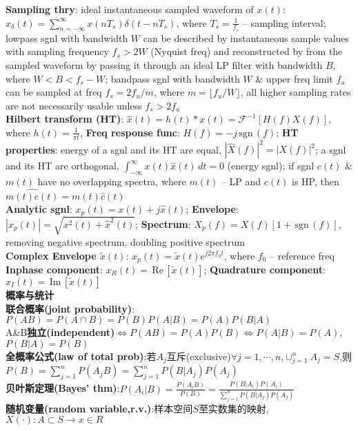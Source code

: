 \documentclass[UTF8,a4paper,10pt]{article}
\providecommand{\abs}[1]{\left\lvert#1\right\rvert}
\providecommand{\re}{\,\text{Re}\,}
\providecommand{\im}{\,\text{Im}\,}
\providecommand{\sgn}{\,\text{sgn}\,}
\begin{document}
\begin{multicols}{2}
    \textbf{Sampling thry}: ideal instantaneous sampled waveform of $x(t)$: $x_{\delta}(t)=\sum_{n=-\infty}^{\infty}x(nT_s)\delta(t-nT_s)$, where $T_s=\frac{1}{f_s}$ -- sampling interval; lowpass sgnl with bandwidth $W$ can be described by instantaneous sample values with sampling frequency $f_s>2W$ (Nyquist freq) and reconstructed by from the sampled waveform by passing it through an ideal LP filter with bandwidth $B$, where $W<B<f_s-W$; bandpass sgnl with bandwidth $W$ \& upper freq limit $f_u$ can be sampled at freq $f_s=2f_u/m$, where $m=\lfloor f_u/W\rfloor$, all higher sampling rates are not necessarily usable unless $f_s>2f_u$\\
    \textbf{Hilbert transform (HT)}: $\hat{x}(t)=h(t)*x(t)=\mathscr{F}^{-1}[H(f)X(f)]$, where $h(t)=\frac{1}{\pi t}$, \textbf{Freq response func}: $H(f)=-j\sgn(f)$; \textbf{HT properties}: energy of a sgnl and its HT are equal, $\abs{\hat{X}(f)}^2=\abs{X(f)}^2$; a sgnl and its HT are orthogonal, $\int_{-\infty}^{\infty}x(t)\hat{x}(t)\,dt=0$ (energy sgnl); if sgnl $c(t)$ \& $m(t)$ have no overlapping spectra, where $m(t)$ -- LP and $c(t)$ is HP, then $\widehat{m(t)c(t)}=m(t)\hat{c}(t)$\\
    \textbf{Analytic sgnl}: $x_p(t)=x(t)+j\hat{x}(t)$; \textbf{Envelope}: $\abs{x_p(t)}=\sqrt{x^2(t)+\hat{x}^2(t)}$; \textbf{Spectrum}: $X_p(f)=X(f)[1+\sgn(f)]$, removing negative spectrum, doubling positive spectrum\\
    \textbf{Complex Envelope $\tilde{x}(t)$}: $x_p(t)=\tilde{x}(t)e^{j2\pi f_0t}$, where $f_0$ -- reference freq\\
    \textbf{Inphase component}: $x_R(t)=\re[\tilde{x}(t)]$; \textbf{Quadrature component}: $x_I(t)=\im[\tilde{x}(t)]$\\
    \textbf{概率与统计}\hrulefill\\
    \textbf{联合概率(joint probability)}:$P(AB)=P(A\cap B)=P(B)P(A\vert B)=P(A)P(B\vert A)$\\
    A\&B\textbf{独立(independent)}$\Leftrightarrow P(AB)=P(A)P(B)\Leftrightarrow P(A\vert B)=P(A)$,$P(B\vert A)=P(B)$\\
    \textbf{全概率公式(law of total prob)}:若$A_j$互斥(exclusive)$\forall j=1,\cdots,n$,$\cup_{j=1}^nA_j=S$,则$P(B)=\sum_{j=1}^nP(A_jB)=\sum_{j=1}^nP(B\vert A_j)P(A_j)$\\
    \textbf{贝叶斯定理(Bayes' thm)}:$P(A_i\vert B)=\frac{P(A_iB)}{P(B)}=\frac{P(B\vert A_i)P(A_i)}{\sum_{j=1}^nP(B\vert A_j)P(A_j)}$\\
    \textbf{随机变量(random variable,r.v.)}:样本空间$S$至实数集的映射,$X(\cdot):A\subset S\rightarrow x\in R$\\

\end{multicols}
\end{document}
